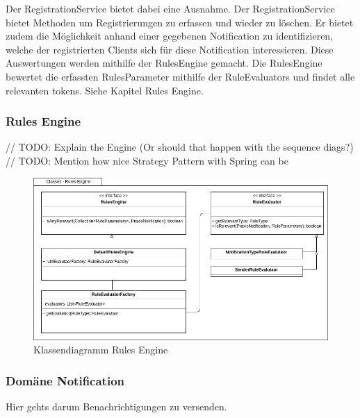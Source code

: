 Der RegistrationService bietet dabei eine Ausnahme.
Der RegistrationService bietet Methoden um Registrierungen zu erfassen und wieder zu löschen.
Er bietet zudem die Möglichkeit anhand einer gegebenen Notification zu identifizieren, welche der registrierten Clients sich für diese Notification interessieren.
Diese Auswertungen werden mithilfe der RulesEngine gemacht.
Die RulesEngine bewertet die erfassten RulesParameter mithilfe der RuleEvaluators und findet alle relevanten tokens. Siehe Kapitel Rules Engine.

\clearpage
\subsubsection*{Rules Engine}

// TODO: Explain the Engine (Or should that happen with the sequence diags?)
// TODO: Mention how nice Strategy Pattern with Spring can be

\begin{figure}[h]
    \centering
    \begin{minipage}[b]{1.0\textwidth}
        \includegraphics[width=\textwidth]{graphics/Class_Configuration_RulesEngine}
        \caption{Klassendiagramm Rules Engine}
    \end{minipage}
\end{figure}

\clearpage
\subsubsection*{Domäne Notification}

Hier gehts darum Benachrichtigungen zu versenden.

